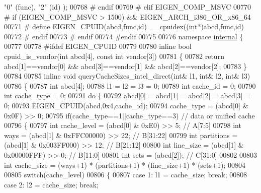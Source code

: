 \begin{DoxyCode}
{{       "0" (func), "2" (id) );}
00768 \textcolor{preprocessor}{#    endif}
00769 \textcolor{preprocessor}{#  elif EIGEN\_COMP\_MSVC}
00770 \textcolor{preprocessor}{#    if (EIGEN\_COMP\_MSVC > 1500) && EIGEN\_ARCH\_i386\_OR\_x86\_64}
00771 \textcolor{preprocessor}{#      define EIGEN\_CPUID(abcd,func,id) \_\_cpuidex((int*)abcd,func,id)}
00772 \textcolor{preprocessor}{#    endif}
00773 \textcolor{preprocessor}{#  endif}
00774 \textcolor{preprocessor}{#endif}
00775 
00776 \textcolor{keyword}{namespace }\hyperlink{namespaceinternal}{internal} \{
00777 
00778 \textcolor{preprocessor}{#ifdef EIGEN\_CPUID}
00779 
00780 \textcolor{keyword}{inline} \textcolor{keywordtype}{bool} cpuid\_is\_vendor(\textcolor{keywordtype}{int} abcd[4], \textcolor{keyword}{const} \textcolor{keywordtype}{int} vendor[3])
00781 \{
00782   \textcolor{keywordflow}{return} abcd[1]==vendor[0] && abcd[3]==vendor[1] && abcd[2]==vendor[2];
00783 \}
00784 
00785 \textcolor{keyword}{inline} \textcolor{keywordtype}{void} queryCacheSizes\_intel\_direct(\textcolor{keywordtype}{int}& l1, \textcolor{keywordtype}{int}& l2, \textcolor{keywordtype}{int}& l3)
00786 \{
00787   \textcolor{keywordtype}{int} abcd[4];
00788   l1 = l2 = l3 = 0;
00789   \textcolor{keywordtype}{int} cache\_id = 0;
00790   \textcolor{keywordtype}{int} cache\_type = 0;
00791   \textcolor{keywordflow}{do} \{
00792     abcd[0] = abcd[1] = abcd[2] = abcd[3] = 0;
00793     EIGEN\_CPUID(abcd,0x4,cache\_id);
00794     cache\_type  = (abcd[0] & 0x0F) >> 0;
00795     \textcolor{keywordflow}{if}(cache\_type==1||cache\_type==3) \textcolor{comment}{// data or unified cache}
00796     \{
00797       \textcolor{keywordtype}{int} cache\_level = (abcd[0] & 0xE0) >> 5;  \textcolor{comment}{// A[7:5]}
00798       \textcolor{keywordtype}{int} ways        = (abcd[1] & 0xFFC00000) >> 22; \textcolor{comment}{// B[31:22]}
00799       \textcolor{keywordtype}{int} partitions  = (abcd[1] & 0x003FF000) >> 12; \textcolor{comment}{// B[21:12]}
00800       \textcolor{keywordtype}{int} line\_size   = (abcd[1] & 0x00000FFF) >>  0; \textcolor{comment}{// B[11:0]}
00801       \textcolor{keywordtype}{int} sets        = (abcd[2]);                    \textcolor{comment}{// C[31:0]}
00802 
00803       \textcolor{keywordtype}{int} cache\_size = (ways+1) * (partitions+1) * (line\_size+1) * (sets+1);
00804 
00805       \textcolor{keywordflow}{switch}(cache\_level)
00806       \{
00807         \textcolor{keywordflow}{case} 1: l1 = cache\_size; \textcolor{keywordflow}{break};
00808         \textcolor{keywordflow}{case} 2: l2 = cache\_size; \textcolor{keywordflow}{break};
}
\end{DoxyCode}

